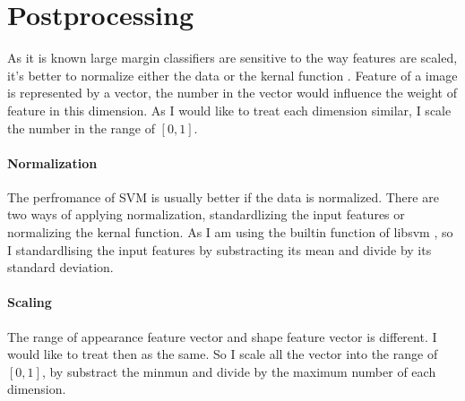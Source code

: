 \section{Postprocessing}
As it is known large margin classifiers are sensitive to the way features are scaled, it's better to normalize either the data or the kernal function \cite{ben2010user}. Feature of a image is represented by a vector, the number in the vector would influence the weight of feature in this dimension. As I would like to treat each dimension similar, I scale the number in the range of $[0,1]$.
\paragraph{Normalization}
The perfromance of SVM is usually better if the data is normalized. There are two ways of applying normalization, standardlizing the input features or normalizing the kernal function. As I am using the builtin function of libsvm \cite{CC01a}, so I standardlising the input features by substracting its mean and divide by its standard deviation.
\paragraph{Scaling}
The range of appearance feature vector and shape feature vector is different. I would like to treat then as the same. So I scale all the vector into the range of $[0, 1]$, by substract the minmun and divide by the maximum number of each dimension.